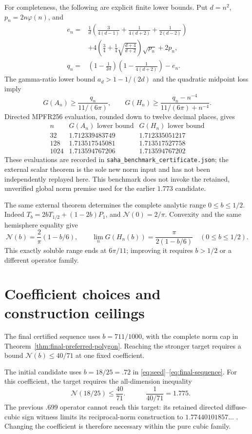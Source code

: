 \documentclass[11pt]{article}
\newcommand{\N}{\mathcal N}
\begin{document}
For completeness, the following are explicit finite lower bounds.
Put $d=n^2$, $p_n=2n\varphi(n)$, and
\begin{align*}
 e_n={}&\frac1d\left(\frac{3}{4(d-1)}+
             \frac1{4(d+2)}+\frac1{2(d-2)}\right)\\
 &+4\left(\frac34+\frac14\sqrt{\frac{d+4}{d+2}}\right)
       \sqrt{p_n}+2p_n,\\
 q_n={}&\left(1-\frac1{2d}\right)
             \left(1-\frac1{4(d+2)}\right)-e_n.
\end{align*}
The gamma-ratio lower bound $a_d>1-1/(2d)$ and the quadratic
midpoint loss imply
\[
 G(A_n)\geq\frac{q_n}{11/(6\pi)},\qquad
 G(H_n)\geq\frac{q_n-n^{-4}}{11/(6\pi)+n^{-4}}.
\]
Directed MPFR256 evaluation, rounded down to twelve decimal places,
gives
\[
\begin{array}{c|cc}
 n & G(A_n)\text{ lower bound} & G(H_n)\text{ lower bound}\\\hline
 32&1.712339483749&1.712335051217\\
 128&1.713517545081&1.713517527758\\
 1024&1.713594767206&1.713594767202
\end{array}
\]
These evaluations are recorded in
\texttt{saha\_benchmark\_certificate.json}; the external scalar
theorem is the sole new norm input and has not been independently
replayed here.  This benchmark does not invoke the retained, unverified
global norm premise used for the earlier $1.773$ candidate.

The same external theorem determines the complete analytic range
$0\le b\le1/2$. Indeed
$T_b=2bT_{1/2}+(1-2b)P_1$, and $\N(0)=2/\pi$.
Convexity and the same hemisphere equality give
\[
 \N(b)=\frac2\pi(1-b/6),\qquad
 \lim_nG(H_n(b))=\frac{\pi}{2(1-b/6)}
 \quad(0\le b\le1/2).
\]
This exactly soluble range ends at $6\pi/11$; improving it requires
$b>1/2$ or a different operator family.

\section{Coefficient choices and construction ceilings}
The final certified sequence uses $b=711/1000$, with the complete norm
cap in Theorem~\ref{thm:final-preferred-polygon}. Reaching the stronger
target requires a bound $\N(b)\le40/71$ at one fixed coefficient.

The initial candidate uses $b=18/25=.72$ in
\eqref{eq:seed}--\eqref{eq:final-sequence}. For this coefficient,
the target requires the all-dimension inequality
\begin{equation}\label{eq:target}
 \boxed{\quad\N(18/25)\le\frac{40}{71}.
 \quad}\qquad \frac1{40/71}=1.775.
\end{equation}
The previous $.699$ operator cannot reach this target: its retained
directed diffuse-cubic sign witness limits its reciprocal-norm construction
to $1.77440101857\ldots$ \cite{history}. Changing the coefficient is
therefore necessary within the pure cubic family.
\end{document}
